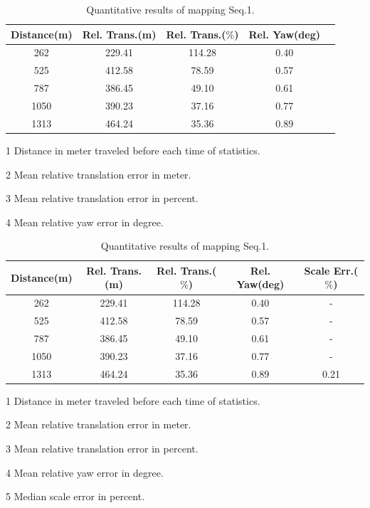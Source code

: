 \begin{table}
	\centering
	\caption{Quantitative results of mapping Seq.1.}
	\begin{threeparttable}
		\begin{tabular}{|c|c|c|c|c|}
			\hline
			Distance(m)\tnote{1} & Rel. Trans.(m)\tnote{2}  & Rel. Trans.($\%$)\tnote{3} & Rel. Yaw(deg)\tnote{4}   \\
			\hline
			262& 229.41 & 114.28 & 0.40  \\
			\hline
			525&412.58& 78.59 & 0.57 \\
			\hline
			787&386.45& 49.10 & 0.61  \\
			\hline
			1050&390.23& 37.16 & 0.77  \\
			\hline
			1313&464.24& 35.36 & 0.89 \\
			\hline
		\end{tabular}
		\begin{tablenotes}
			\footnotesize
			\item[1] Distance in meter traveled before each time of statistics. 
			\item[2] Mean relative translation error in meter.
			\item[3] Mean relative translation error in percent.
			\item[4] Mean relative yaw error in degree.
		\end{tablenotes}
	
	\ifoutputscaleerror
			\begin{tabular}{|c|c|c|c|c|}
		\hline
		Distance(m)\tnote{1} & Rel. Trans.(m)\tnote{2}  & Rel. Trans.($\%$)\tnote{3} & Rel. Yaw(deg)\tnote{4} & Scale Err.($\%$)\tnote{5}  \\
		\hline
		262& 229.41 & 114.28 & 0.40 & - \\
		\hline
		525&412.58& 78.59 & 0.57 & - \\
		\hline
		787&386.45& 49.10 & 0.61 & - \\
		\hline
		1050&390.23& 37.16 & 0.77 & - \\
		\hline
		1313&464.24& 35.36 & 0.89 & 0.21\\
		\hline
	\end{tabular}
	\begin{tablenotes}
		\footnotesize
		\item[1] Distance in meter traveled before each time of statistics. 
		\item[2] Mean relative translation error in meter.
		\item[3] Mean relative translation error in percent.
		\item[4] Mean relative yaw error in degree.
		\item[5] Median scale error in percent.
	\end{tablenotes}
\fi
	\end{threeparttable}
	\label{tbl:kittiseq1quanresult}
\end{table}

